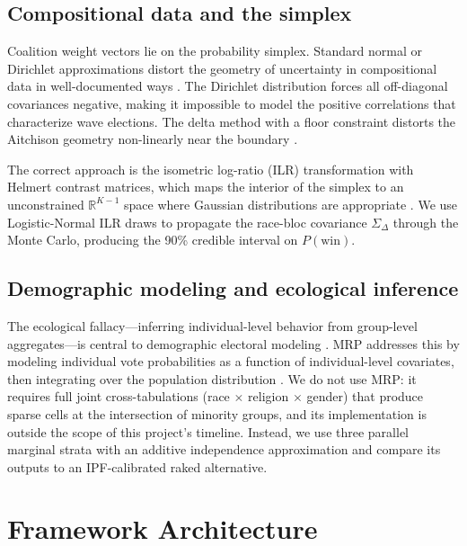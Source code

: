 \documentclass[12pt, letterpaper]{article}
\theoremstyle{definition}
\newcommand{\SigmaDelta}{\Sigma_{\Delta}}
\begin{document}
\subsection{Compositional data and the simplex}

Coalition weight vectors lie on the probability simplex. Standard normal or
Dirichlet approximations distort the geometry of uncertainty in compositional
data in well-documented ways \citep{Aitchison1986}. The Dirichlet distribution
forces all off-diagonal covariances negative, making it impossible to model the
positive correlations that characterize wave elections. The delta method with
a floor constraint distorts the Aitchison geometry non-linearly near the boundary
\citep{Egozcue2003}.

The correct approach is the isometric log-ratio (ILR) transformation with
Helmert contrast matrices, which maps the interior of the simplex to an
unconstrained $\mathbb{R}^{K-1}$ space where Gaussian distributions are
appropriate \citep{Pawlowsky2015}. We use Logistic-Normal ILR draws to
propagate the race-bloc covariance $\SigmaDelta$ through the Monte Carlo,
producing the 90\% credible interval on $P(\text{win})$.

\subsection{Demographic modeling and ecological inference}

The ecological fallacy---inferring individual-level behavior from group-level
aggregates---is central to demographic electoral modeling
\citep{Robinson1950, King1997}. MRP addresses this by modeling individual vote
probabilities as a function of individual-level covariates, then integrating
over the population distribution \citep{Park2004}. We do not use MRP: it
requires full joint cross-tabulations (race $\times$ religion $\times$ gender)
that produce sparse cells at the intersection of minority groups, and its
implementation is outside the scope of this project's timeline. Instead, we
use three parallel marginal strata with an additive independence approximation
and compare its outputs to an IPF-calibrated raked alternative.

\section{Framework Architecture}
\label{sec:framework}
\end{document}
